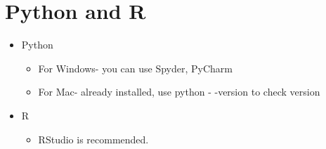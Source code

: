 \documentclass[10pt]{article}
\begin{document}
\section{Python and R}
\begin{itemize}
\item Python
 \begin{itemize}
   \item For Windows- you can use Spyder, PyCharm
   \item For Mac- already installed, use \textsf{python - -version} to check version
 \end{itemize}  
\item R
\begin{itemize}
   \item RStudio is recommended.
 \end{itemize}  

\end{itemize} 
\end{document}
